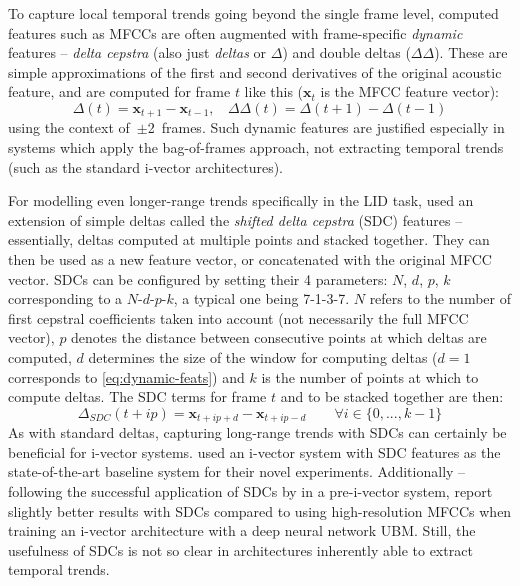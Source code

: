 \documentclass[bsc,frontabs,twoside,singlespacing,parskip,deptreport]{infthesis}
\begin{document}
{{{      %
      To capture local temporal trends going beyond the single frame level, computed features such as MFCCs are often augmented with frame-specific \textit{dynamic} features -- \textit{delta cepstra} (also just \textit{deltas} or $\Delta$) and double deltas ($\Delta\Delta$). These are simple approximations of the first and second derivatives of the original acoustic feature, and are computed for frame $t$ like this ($\mathbf{x}_t$ is the MFCC feature vector):
      \begin{equation}
        \label{eq:dynamic-feats}
        \Delta(t) = \mathbf{x}_{t+1} - \mathbf{x}_{t-1},\ \ \ \ \Delta\Delta(t) = \Delta(t+1) - \Delta(t-1)
      \end{equation}
      using the context of~$\pm$2~frames. Such dynamic features are justified especially in systems which apply the bag-of-frames approach, not extracting temporal trends (such as the standard i-vector architectures).

      For modelling even longer-range trends specifically in the LID task, \citet{Torres-Carrasquillo_et_al_2002} used an extension of simple deltas called the \textit{shifted delta cepstra} (SDC) features -- essentially, deltas computed at multiple points and stacked together. They can then be used as a new feature vector, or concatenated with the original MFCC vector. SDCs can be configured by setting their 4 parameters: $N$, $d$, $p$, $k$ corresponding to a $N$-$d$-$p$-$k$, a typical one being 7-1-3-7. $N$ refers to the number of first cepstral coefficients taken into account (not necessarily the full MFCC vector), $p$ denotes the distance between consecutive points at which deltas are computed, $d$ determines the size of the window for computing deltas ($d=1$ corresponds to \autoref{eq:dynamic-feats}) and $k$ is the number of points at which to compute deltas. The SDC terms for frame $t$ and to be stacked together are then:
      \begin{equation}
        \label{eq:sdc-feats}
        \Delta_{SDC}(t+ip) = \mathbf{x}_{t+ip+d} - \mathbf{x}_{t+ip-d} \quad\quad \forall i \in \{0, ..., k-1\}
      \end{equation}
      As with standard deltas, capturing long-range trends with SDCs can certainly be beneficial for i-vector systems. \cite{Ferrer_et_al_2016} used an i-vector system with SDC features as the state-of-the-art baseline system for their novel experiments. Additionally -- following the successful application of SDCs by \citeauthor{Torres-Carrasquillo_et_al_2002} in a pre-i-vector system, \cite{Sarma_et_al_2018} report slightly better results with SDCs compared to using high-resolution MFCCs when training an i-vector architecture with a deep neural network UBM. Still, the usefulness of SDCs is not so clear in architectures inherently able to extract temporal trends.

}}}
\end{document}
